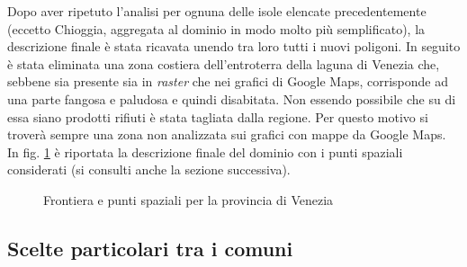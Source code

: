 \documentclass[a4paper,11pt,twoside,openright]{book}							%
\begin{document}
Dopo aver ripetuto l'analisi per ognuna delle isole elencate precedentemente (eccetto Chioggia, aggregata al dominio in modo molto più semplificato), la descrizione finale è stata ricavata unendo tra loro tutti i nuovi poligoni. In seguito è stata eliminata una zona costiera dell'entroterra della laguna di Venezia che, sebbene sia presente sia in \textit{raster} che nei grafici di Google Maps, corrisponde ad una parte fangosa e paludosa e quindi disabitata. Non essendo possibile che su di essa siano prodotti rifiuti è stata tagliata dalla regione. Per questo motivo si troverà sempre una zona non analizzata sui grafici con mappe da Google Maps. In fig. \ref{fig:Ven_rgm} è riportata la descrizione finale del dominio con i punti spaziali considerati (si consulti anche la sezione successiva).
\begin{figure}[t]
	\centering
	\caption{Frontiera e punti spaziali per la provincia di Venezia}
	\label{fig:Ven_rgm}
\end{figure}

\subsection{Scelte particolari tra i comuni}
\label{sez:comunireplicati}
\end{document}
